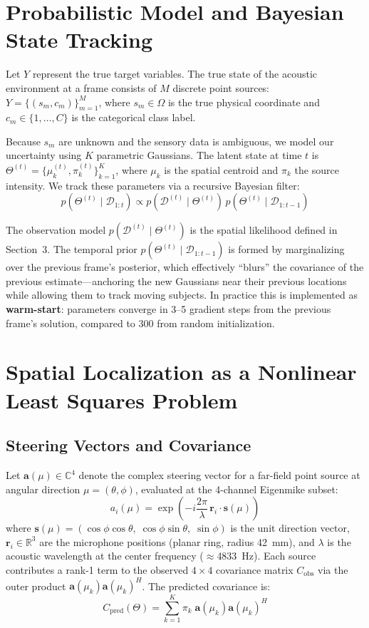\documentclass{article}
\begin{document}
\section{Probabilistic Model and Bayesian State Tracking}
Let $Y$ represent the true target variables. The true state of the acoustic environment at a frame consists of $M$ discrete point sources: $Y = \{ (s_m, c_m) \}_{m=1}^M$, where $s_m \in \Omega$ is the true physical coordinate and $c_m \in \{1, \dots, C\}$ is the categorical class label.

Because $s_m$ are unknown and the sensory data is ambiguous, we model our uncertainty using $K$ parametric Gaussians. The latent state at time $t$ is $\Theta^{(t)} = \{\mu_k^{(t)}, \pi_k^{(t)}\}_{k=1}^K$, where $\mu_k$ is the spatial centroid and $\pi_k$ the source intensity. We track these parameters via a recursive Bayesian filter:
\begin{equation}
p(\Theta^{(t)} \mid \mathcal{D}_{1:t}) \propto p(\mathcal{D}^{(t)} \mid \Theta^{(t)}) \, p(\Theta^{(t)} \mid \mathcal{D}_{1:t-1})
\end{equation}

The observation model $p(\mathcal{D}^{(t)} \mid \Theta^{(t)})$ is the spatial likelihood defined in Section~3. The temporal prior $p(\Theta^{(t)} \mid \mathcal{D}_{1:t-1})$ is formed by marginalizing over the previous frame's posterior, which effectively ``blurs'' the covariance of the previous estimate---anchoring the new Gaussians near their previous locations while allowing them to track moving subjects. In practice this is implemented as \textbf{warm-start}: parameters converge in 3--5 gradient steps from the previous frame's solution, compared to 300 from random initialization.


\section{Spatial Localization as a Nonlinear Least Squares Problem}

\subsection{Steering Vectors and Covariance}
Let $\mathbf{a}(\mu) \in \mathbb{C}^4$ denote the complex steering vector for a far-field point source at angular direction $\mu = (\theta, \phi)$, evaluated at the 4-channel Eigenmike subset:
\begin{equation}
a_i(\mu) = \exp\!\left(-i \frac{2\pi}{\lambda} \, \mathbf{r}_i \cdot \mathbf{s}(\mu)\right)
\end{equation}
where $\mathbf{s}(\mu) = (\cos\phi \cos\theta,\; \cos\phi \sin\theta,\; \sin\phi)$ is the unit direction vector, $\mathbf{r}_i \in \mathbb{R}^3$ are the microphone positions (planar ring, radius 42~mm), and $\lambda$ is the acoustic wavelength at the center frequency ($\approx$4833~Hz). Each source contributes a rank-1 term to the observed $4 \times 4$ covariance matrix $C_{\text{obs}}$ via the outer product $\mathbf{a}(\mu_k) \mathbf{a}(\mu_k)^H$. The predicted covariance is:
\begin{equation}
C_{\text{pred}}(\Theta) = \sum_{k=1}^K \pi_k \; \mathbf{a}(\mu_k) \mathbf{a}(\mu_k)^H
\end{equation}
\end{document}
